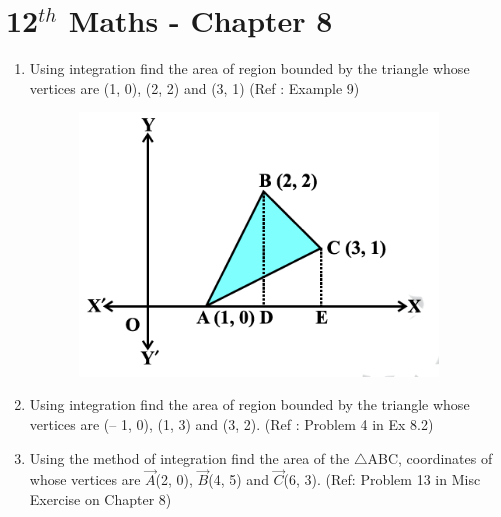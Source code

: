 \documentclass[12pt]{article}
\begin{document}
\section{12$^{th}$ Maths - Chapter 8} %
\begin{enumerate}
\item Using integration find the area of region bounded by the triangle whose
vertices are (1, 0), (2, 2) and (3, 1) (Ref : Example 9)

\begin{figure}[!h]
	\includegraphics[width=10cm,height=7cm]{./fig1}
\label{fig:Fig1}
\end{figure}

\item Using integration find the area of region bounded by the triangle whose vertices
are (– 1, 0), (1, 3) and (3, 2). (Ref : Problem 4 in Ex 8.2)

\item Using the method of integration find the area of the $\triangle$ABC, coordinates of whose vertices are $\vec{A}$(2, 0), $\vec{B}$(4, 5) and $\vec{C}$(6, 3). (Ref: Problem 13 in Misc Exercise on Chapter 8)

\end{enumerate}
\end{document}
